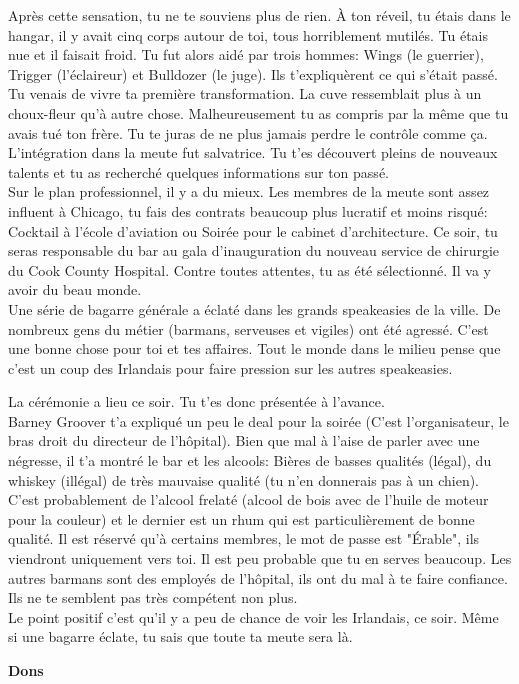 \documentclass[oneside,12pt]{book}
\begin{document}
\begin{flushleft}
\begin{description}
{Après cette sensation, tu ne te souviens plus de rien. À ton réveil, tu étais dans le hangar, il y avait cinq corps autour de toi, tous horriblement mutilés. 
Tu étais nue et il faisait froid. Tu fut alors aidé par trois hommes: Wings (le guerrier), Trigger (l'éclaireur) et Bulldozer (le juge).
Ils t'expliquèrent ce qui s'était passé. Tu venais de vivre ta première transformation. La cuve ressemblait plus à un choux-fleur qu'à autre chose. Malheureusement tu as compris par la même que tu avais tué ton frère. Tu te juras de ne plus jamais perdre le contrôle comme ça. 
L'intégration dans la meute fut salvatrice. Tu t'es découvert pleins de nouveaux talents et tu as recherché quelques informations sur ton passé.\\
Sur le plan professionnel, il y a du mieux. Les membres de la meute sont assez influent à Chicago, tu fais des contrats beaucoup plus lucratif et moins risqué: Cocktail à l'école d'aviation ou Soirée pour le cabinet d'architecture. 
Ce soir, tu seras responsable du bar au gala d'inauguration du nouveau service de chirurgie du Cook County Hospital. Contre toutes attentes, tu as été sélectionné.  
Il va y avoir du beau monde. \\
Une série de bagarre générale a éclaté dans les grands speakeasies de la ville. De nombreux gens du métier (barmans, serveuses et vigiles) ont été agressé. C'est une bonne chose pour toi et tes affaires. Tout le monde dans le milieu pense que c'est un coup des Irlandais pour faire pression sur les autres speakeasies.

La cérémonie a lieu ce soir. Tu t'es donc présentée à l'avance. \\
Barney Groover t'a expliqué un peu le deal pour la soirée (C'est l'organisateur, le bras droit du directeur de l'hôpital). 
Bien que mal à l'aise de parler avec une négresse, il t'a montré le bar et les alcools: Bières de basses qualités (légal), du whiskey (illégal) de très 
mauvaise qualité (tu n'en donnerais pas à un chien). C'est probablement de l'alcool frelaté (alcool de bois avec de l'huile de moteur pour la couleur) et le dernier est un rhum qui est particulièrement de bonne qualité.
Il est réservé qu'à certains membres, le mot de passe est "Érable", ils viendront uniquement vers toi. Il est peu probable que tu en serves beaucoup. 
Les autres barmans sont des employés de l'hôpital, ils ont du mal à te faire confiance. Ils ne te semblent pas très compétent non plus.\\

Le point positif c'est qu'il y a peu de chance de voir les Irlandais, ce soir. Même si une bagarre éclate, tu sais que toute ta meute sera là.
}
\end{description}
\textbf{\large Dons} 
\vspace{0.5cm}



\end{flushleft}
\end{document}
